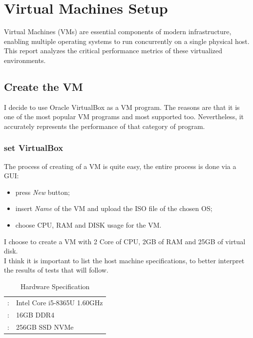 \chapter{Virtual Machines Setup}

Virtual Machines (VMs) are essential components of modern infrastructure, enabling multiple operating systems to run concurrently on a single physical host. This report analyzes the critical performance metrics of these virtualized environments.

\section{Create the VM}

I decide to use Oracle VirtualBox as a VM program. The reasons are that it is one of the most popular VM programs and most supported too. Nevertheless, it accurately represents the performance of that category of program.

\subsection{set VirtualBox}
The process of creating of a VM is quite easy, the entire process is done via a GUI:

\begin{itemize}
    \item press \textit{New} button;
    \item insert \textit{Name} of the VM and upload the ISO file of the chosen OS;
    \item choose CPU, RAM and DISK usage for the VM.
\end{itemize}

I choose to create a VM with 2 Core of CPU, 2GB of RAM and 25GB of virtual disk. \\
I think it is important to list the host machine specifications, to better interpret the results of tests that will follow.

\begin{table}[H]
    \centering
    \begin{tabular}{r|l}
        \color{UniOrange}{CPU}:  & Intel Core i5-8365U 1.60GHz \\
        \color{UniOrange}{RAM}:  & 16GB DDR4                   \\
        \color{UniOrange}{DISK}: & 256GB SSD NVMe
    \end{tabular}
    \caption{Hardware Specification}
    \label{tab:hardware}
\end{table}

